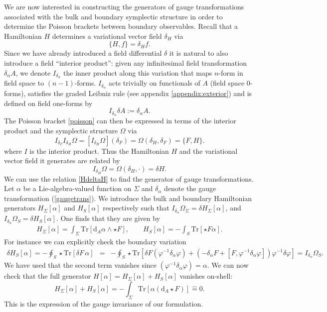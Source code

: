 \documentclass[a4paper,11pt]{article}
\newcommand{\be}{\begin{equation}}
\newcommand{\ee}{\end{equation}}
\newcommand{\bea}{\begin{eqnarray}}
\newcommand{\eea}{\end{eqnarray}}
\def\rd{\mathrm{d}}
\newcommand{\hateq}{\mathrel{\hat{=}}}
\newcommand{\Tr}{\mbox{Tr}}
\begin{document}
We are now interested in constructing the generators of gauge transformations associated with the bulk and boundary symplectic structure in order to determine the Poisson brackets between boundary observables. 
Recall that a Hamiltonian $H$ determines a variational vector field $\delta_H$ via 
\begin{equation} \label{poisson}
\Big\{H , f \Big\} = \delta_H f.
\end{equation}
Since we have already introduced a field differential $\delta$ it is natural to also introduce a field ``interior product'': given any infinitesimal field transformation $\delta_\alpha A$, we denote $I_{\delta_\alpha}$ the inner product along this variation that maps $n$-form in field space to $(n-1)$-forms.
$I_{\delta_\alpha}$ acts trivially on functionals of $A$ (field space $0$-forms), satisfies the graded Leibniz rule (see appendix \ref{appendix:exterior}) and is defined on field one-forms by
\be
I_{\delta_\alpha} \delta A := {\delta_\alpha}A.
\ee
The Poisson bracket \eqref{poisson} can then be expressed in terms of the interior product and the symplectic structure $\Omega$ via   
\be
I_{\delta_F}I_{\delta_H}\Omega=[I_{\delta_H}\Omega] (\delta_F) ={\Omega}(\delta_H,\delta_F) = \Big\{F,H\Big\}.
\ee 
where $I$ is the interior product. 
Thus the Hamiltonian $H$ and the variational vector field it generates are related by
\be \label{HdeltaH}
I_{\delta_{H}}\Omega =\Omega(\delta_H,\cdot)= \delta H.
\ee
We can use the relation \eqref{HdeltaH} to find the generator of gauge transformations.
Let $\alpha$ be a Lie-algebra-valued function on $\Sigma$ and $\delta_\alpha$ denote the gauge transformation (\ref{gaugetrans}).
We introduce the bulk and boundary Hamiltonian generators $H_\Sigma[\alpha]$ and $H_S[\alpha]$ respectively such that
$
I_{\delta_\alpha}\Omega_\Sigma = \delta H_\Sigma[\alpha]$,  and $ 
I_{\delta_\alpha}\Omega_S = \delta H_S[\alpha]$.
One finds that they are given by
\bea
H_\Sigma[\alpha]= \int_\Sigma \Tr [ \rd_A \alpha \wedge \star F ],\qquad
H_S[\alpha]=- \int_S \Tr [\star F \alpha].
\eea
For instance we can explicitly check the boundary variation 
\bea
\delta H_S[\alpha] = -\oint_S \star \Tr [ \delta F\, \alpha ] &=&-
 \oint_S \star \Tr [  \delta F (\varphi^{-1} \delta_\alpha \varphi)+ (-\delta_\alpha F + [F, \varphi^{-1} \delta_\alpha \varphi]) \varphi^{-1} \delta \varphi]=  I_{\delta_\alpha} \Omega_S. \nonumber
\eea
We have used that the second term vanishes since $
(\varphi^{-1} \delta_\alpha \varphi) =\alpha$.
We can now check that the full generator $H[\alpha] = H_\Sigma[\alpha] + H_S[\alpha]$ vanishes on-shell:
\be
H_\Sigma[\alpha] + H_S[\alpha] =- \int_\Sigma \Tr [\alpha (\rd_A \star F)  ] \hateq 0.
\ee
This is the expression of the gauge invariance of our formulation.
\end{document}
